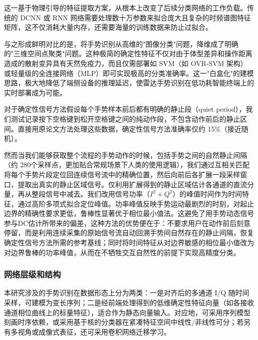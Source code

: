 这一基于物理引导的特征提取方案，从根本上改变了后续分类网络的工作负载。传统的 DCNN 或 RNN 网络需要处理数十万参数来拟合庞大且复杂的时频谱图特征矩阵，这不仅消耗大量内存，还需要海量的训练数据来防止过拟合。

与之形成鲜明对比的是，将手势识别从高维的"图像分类"问题，降维成了明确的"三维空间点聚类"问题。这种极简的确定性特征不仅对由于体型差异和操作距离造成的散射变异具有天然免疫力，而且仅需部署如 SVM（如 OVR-SVM 架构）或轻量级的全连接网络（MLP）即可实现极高的分类准确率。这一"白盒化"的建模思路，极大地降低了端侧设备的推理延迟，使雷达手势识别在低功耗智能终端上的实时部署成为可能。

对于确定性信号方法假设每个手势样本前后都有明确的静止段（quiet period），我们测试记录按下空格键到松开空格键之间的纯动作段，不包含动作前后的静止区间。直接用原论文方法处理这些数据，确定性信号方法准确率仅约 15\%（接近随机）。

然而当我们能够获取整个流程的手势动作的时候，包括手势之间的自然静止间隔（约 280个采样点，更加贴合常规场景下人类的使用逻辑），我们通过互相关匹配将每个手势片段定位回连续信号流中的精确位置，然后向前后各扩展一段采样窗口，提取出真实的静止区域信号。仅利用扩展得到的静止区域估计各通道的直流分量，再从整段信号中减去。我们改用信号功率（$I^2 + Q^2$）的峰值时间作为时间特征，通过高阶多项式拟合定位峰值。功率峰值反映手势运动最剧烈的时刻，对起止边界的精确性要求更低，鲁棒性显著优于相位最小值法。这避免了用手势动态信号参与DC估计所带来的偏差，这种方法的优势便在于：不要求用户在动作前后刻意停留，而是利用连续采集的原始信号流自动回溯手势间自然存在的静止间隔，恢复确定性信号方法所需的参考基线；同时将时间特征从对边界敏感的相位最小值改为对边界鲁棒的功率峰值，从而在不牺牲交互自然性的前提下实现高精度分类。

\subsubsection{网络层级和结构}

本研究涉及的手势识别在数据形态上分为两类：一是对齐后的多通道 I/Q 随时间采样，可建模为变长序列；二是经前端处理得到的低维确定性特征向量（如各接收通道相位曲线上的标量特征），适合作为静态向量输入。对应地，可采用序列模型刻画时序依赖，或采用基于核的分类器在紧凑特征空间中线性/非线性可分；若另有多视角或成像式表征，还可采用卷积网络迁移学习。

